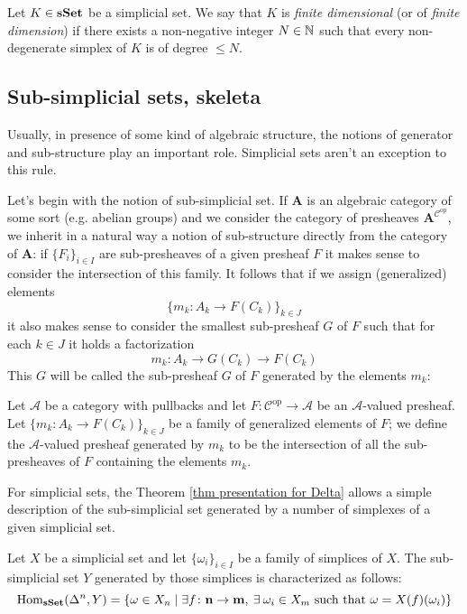 \begin{refsection}
\begin{defin} \label{def simplicial set of finite dimension}
Let $K \in \mathbf{s\,\!\mathbf{Set}}$ be a simplicial set. We say that $K$ is \emph{finite dimensional} (or of \emph{finite dimension}) if there exists a non-negative integer $N \in \mathbb{N}$ such that every non-degenerate simplex of $K$ is of degree $\le N$.
\end{defin}

\subsection{Sub-simplicial sets, skeleta}

Usually, in presence of some kind of algebraic structure, the notions of generator and sub-structure play an important role. Simplicial sets aren't an exception to this rule.

Let's begin with the notion of sub-simplicial set. If $\mathbf A$ is an algebraic category of some sort (e.g. abelian groups) and we consider the category of presheaves $\mathbf A^{\mathcal C^\mathrm{op}}$, we inherit in a natural way a notion of sub-structure directly from the category of $\mathbf A$: if $\{F_i\}_{i \in I}$ are sub-presheaves of a given presheaf $F$ it makes sense to consider the intersection of this family. It follows that if we assign (generalized) elements
\[
\{m_k \colon A_k \to F(C_k)\}_{k \in J}
\]
it also makes sense to consider the smallest sub-presheaf $G$ of $F$ such that for each $k \in J$ it holds a factorization
\[
m_k \colon A_k \to G(C_k) \to F(C_k)
\]
This $G$ will be called the sub-presheaf $G$ of $F$ generated by the elements $m_k$:

\begin{defin}
Let $\mathcal A$ be a category with pullbacks and let $F \colon \mathcal C^{\mathrm{op}} \to \mathcal A$ be an $\mathcal A$-valued presheaf. Let $\{m_k \colon A_k \to F(C_k)\}_{k \in J}$ be a family of generalized elements of $F$; we define the $\mathcal A$-valued presheaf generated by $m_k$ to be the intersection of all the sub-presheaves of $F$ containing the elements $m_k$.
\end{defin}

For simplicial sets, the Theorem \ref{thm presentation for Delta} allows a simple description of the sub-simplicial set generated by a number of simplexes of a given simplicial set.

\begin{prop} \label{prop sub simplicial set}
Let $X$ be a simplicial set and let $\{\omega_i\}_{i \in I}$ be a family of simplices of $X$. The sub-simplicial set $Y$ generated by those simplices is characterized as follows:
\[
\mathrm{Hom}_{\mathbf{s\,\!\mathbf{Set}}}(\Delta^n,Y) = \{\omega \in X_n \mid \exists f \colon \mathbf n \to \mathbf m, \: \exists \: \omega_i \in X_m \text{ such that } \omega = X(f)(\omega_i) \}
\]
\end{prop}


\end{refsection}
